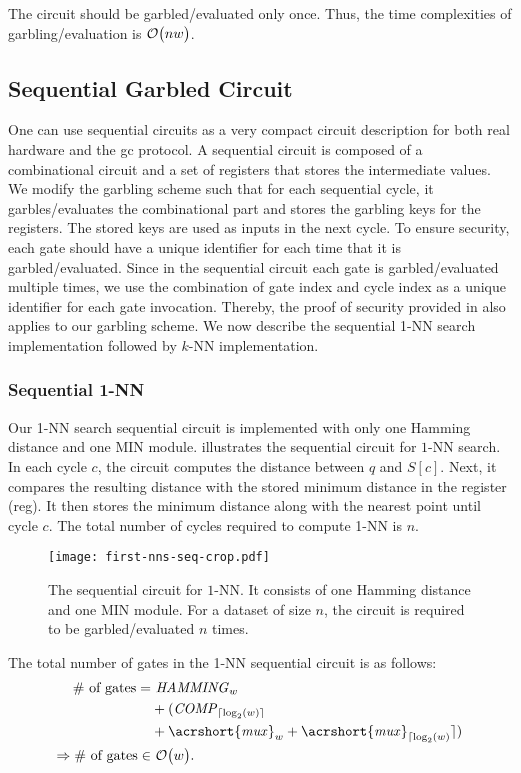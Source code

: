 The circuit should be garbled/evaluated only once.
Thus, the time complexities of garbling/evaluation is $\mathcal{O}\bigl(nw\bigr)$.

\subsection{Sequential Garbled Circuit}\label{ssec:knn-seqgc}
One can use sequential circuits as a very compact circuit description for both real hardware and the \acrshort{gc} protocol.
A sequential circuit is composed of a combinational circuit and a set of registers that stores the intermediate values.
We modify the garbling scheme such that for each sequential cycle, it garbles/evaluates the combinational part and stores the garbling keys for the registers.
The stored keys are used as inputs in the next cycle.
To ensure security, each gate should have a unique identifier for each time that it is garbled/evaluated.
Since in the sequential circuit each gate is garbled/evaluated multiple times, we use the combination of gate index and cycle index as a unique identifier for each gate invocation.
Thereby, the proof of security provided in \cite{lindell2009proof,bellare2013efficient} also applies to our garbling scheme.
We now describe the sequential 1-NN search implementation followed by $k$-NN implementation.

\subsubsection{Sequential 1-NN}
Our 1-NN search sequential circuit is implemented with only one Hamming distance and one MIN module.
 illustrates the sequential circuit for $1$-NN search.
In each cycle $c$, the circuit computes the distance between $q$ and $S[c]$.
Next, it compares the resulting distance with the stored minimum distance in the register (reg).
It then stores the minimum distance along with the nearest point until cycle $c$.
The total number of cycles required to compute 1-NN is $n$.

\begin{figure}
\centering
\texttt{[image: first-nns-seq-crop.pdf]}
\caption{The sequential circuit for $1$-NN.
It consists of one Hamming distance and one MIN module.
For a dataset of size $n$, the circuit is required to be garbled/evaluated $n$ times.}
\label{fig:fist-nns-seq}
\end{figure}

The total number of gates in the 1-NN sequential circuit is as follows:
\begin{align*}
\text{\# of gates}=	& ~ \mathit{HAMMING}_{w}\\
					& + (\mathit{COMP}_{\lceil \log _2(w) \rceil} \\
					& + \mathit{\acrshort{mux}}_w + \mathit{\acrshort{mux}}_{\lceil \log _2(w)} \rceil)\\
\Rightarrow \text{\# of gates} \in & ~ \BigO{w}.
\end{align*}

